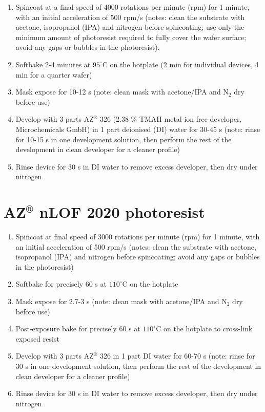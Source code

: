 \documentclass[
  a4paper,
]{scrbook}
\begin{document}
\begin{enumerate}
\def\labelenumi{\arabic{enumi}.}
\item
  Spincoat at a final speed of 4000 rotations per minute (rpm) for 1
  minute, with an initial acceleration of 500 rpm/s (notes: clean the
  substrate with acetone, isopropanol (IPA) and nitrogen before
  spincoating; use only the minimum amount of photoresist required to
  fully cover the wafer surface; avoid any gaps or bubbles in the
  photoresist).
\item
  Softbake 2-4 minutes at \(95^\circ\)C on the hotplate (2 min for
  individual devices, 4 min for a quarter wafer)
\item
  Mask expose for 10-12 s (note: clean mask with acetone/IPA and N\(_2\)
  dry before use)
\item
  Develop with 3 parts AZ\(^\circledR\) 326 (2.38 \% TMAH metal-ion free
  developer, Microchemicals GmbH) in 1 part deionised (DI) water for
  30-45 s (note: rinse for 10-15 s in one development solution, then
  perform the rest of the development in clean developer for a cleaner
  profile)
\item
  Rinse device for 30 s in DI water to remove excess developer, then dry
  under nitrogen
\end{enumerate}

\hypertarget{azcircledr-nlof-2020-photoresist}{%
\section{\texorpdfstring{AZ\(^\circledR\) nLOF 2020
photoresist}{AZ\^{}\textbackslash circledR nLOF 2020 photoresist}}\label{azcircledr-nlof-2020-photoresist}}

\begin{enumerate}
\def\labelenumi{\arabic{enumi}.}
\item
  Spincoat at final speed of 3000 rotations per minute (rpm) for 1
  minute, with an initial acceleration of 500 rpm/s (notes: clean the
  substrate with acetone, isopropanol (IPA) and nitrogen before
  spincoating; avoid any gaps or bubbles in the photoresist)
\item
  Softbake for precisely 60 s at \(110^\circ\)C on the hotplate
\item
  Mask expose for 2.7-3 s (note: clean mask with acetone/IPA and N\(_2\)
  dry before use)
\item
  Post-exposure bake for precisely 60 s at \(110^\circ\)C on the
  hotplate to cross-link exposed resist
\item
  Develop with 3 parts AZ\(^\circledR\) 326 in 1 part DI water for 60-70
  s (note: rinse for 30 s in one development solution, then perform the
  rest of the development in clean developer for a cleaner profile)
\item
  Rinse device for 30 s in DI water to remove excess developer, then dry
  under nitrogen
\end{enumerate}
\end{document}
